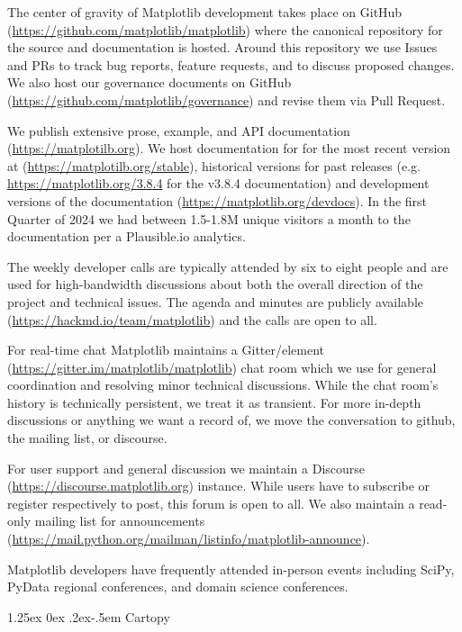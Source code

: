 \documentclass[12pt]{article}
\makeatletter
\numberwithin{page}{section}
\renewcommand{\paragraph}{%
  \@startsection{paragraph}{4}%
  {\z@}{1.25ex \@plus 0ex \@minus .2ex}{-.5em}%
  {\normalfont\normalsize\itshape\bfseries}%
}
\makeatother
\begin{document}
The center of gravity of Matplotlib development takes place on GitHub
(\url{https://github.com/matplotlib/matplotlib}) where the canonical
repository for the source and documentation is hosted.  Around this
repository we use Issues and PRs to track bug reports, feature
requests, and to discuss proposed changes.  We also host our
governance documents on GitHub
(\url{https://github.com/matplotlib/governance}) and revise them via
Pull Request.

We publish extensive prose, example, and API documentation
(\url{https://matplotilb.org}).  We host documentation for for the most recent
version at (\url{https://matplotilb.org/stable}), historical versions for past
releases (e.g. \url{https://matplotlib.org/3.8.4} for the v3.8.4 documentation)
and development versions of the documentation
(\url{https://matplotlib.org/devdocs}).  In the first Quarter of 2024 we had
between 1.5-1.8M unique visitors a month to the documentation per a
Plausible.io analytics.

The weekly developer calls are typically attended by six to eight people and
are used for high-bandwidth discussions about both the overall direction of the
project and technical issues.  The agenda and minutes are publicly available
(\url{https://hackmd.io/team/matplotlib}) and the calls are open to all.

For real-time chat Matplotlib maintains a Gitter/element
(\url{https://gitter.im/matplotlib/matplotlib}) chat room which we use for
general coordination and resolving minor technical discussions.  While the chat
room's history is technically persistent, we treat it as transient.  For more
in-depth discussions or anything we want a record of, we move the conversation
to github, the mailing list, or discourse.

For user support and general discussion we maintain a Discourse
(\url{https://discourse.matplotlib.org}) instance.  While users have to
subscribe or register respectively to post, this forum is open to all.  We also
maintain a read-only mailing list for announcements
(\url{https://mail.python.org/mailman/listinfo/matplotlib-announce}).

Matplotlib developers have frequently attended in-person events including
SciPy, PyData regional conferences, and domain science conferences.

\paragraph{Cartopy}
\end{document}
